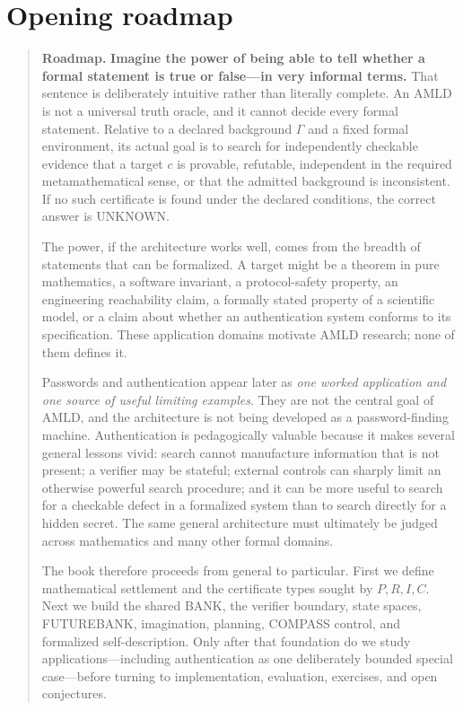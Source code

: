 \documentclass[11pt,openany]{book}
\theoremstyle{definition}
\theoremstyle{remark}
\newenvironment{roadmap}{\begin{quote}\small\color{deepblue}\textbf{Roadmap.} }{\end{quote}}
\begin{document}
\chapter*{Opening roadmap}
\begin{roadmap}
\textbf{Imagine the power of being able to tell whether a formal statement is true or false---in very informal terms.} That sentence is deliberately intuitive rather than literally complete. An AMLD is not a universal truth oracle, and it cannot decide every formal statement. Relative to a declared background $\Gamma$ and a fixed formal environment, its actual goal is to search for independently checkable evidence that a target $c$ is provable, refutable, independent in the required metamathematical sense, or that the admitted background is inconsistent. If no such certificate is found under the declared conditions, the correct answer is \textsf{UNKNOWN}.

The power, if the architecture works well, comes from the breadth of statements that can be formalized. A target might be a theorem in pure mathematics, a software invariant, a protocol-safety property, an engineering reachability claim, a formally stated property of a scientific model, or a claim about whether an authentication system conforms to its specification. These application domains motivate AMLD research; none of them defines it.

Passwords and authentication appear later as \emph{one worked application and one source of useful limiting examples}. They are not the central goal of AMLD, and the architecture is not being developed as a password-finding machine. Authentication is pedagogically valuable because it makes several general lessons vivid: search cannot manufacture information that is not present; a verifier may be stateful; external controls can sharply limit an otherwise powerful search procedure; and it can be more useful to search for a checkable defect in a formalized system than to search directly for a hidden secret. The same general architecture must ultimately be judged across mathematics and many other formal domains.

The book therefore proceeds from general to particular. First we define mathematical settlement and the certificate types sought by $P,R,I,C$. Next we build the shared BANK, the verifier boundary, state spaces, FUTUREBANK, imagination, planning, COMPASS control, and formalized self-description. Only after that foundation do we study applications---including authentication as one deliberately bounded special case---before turning to implementation, evaluation, exercises, and open conjectures.
\end{roadmap}
\end{document}
